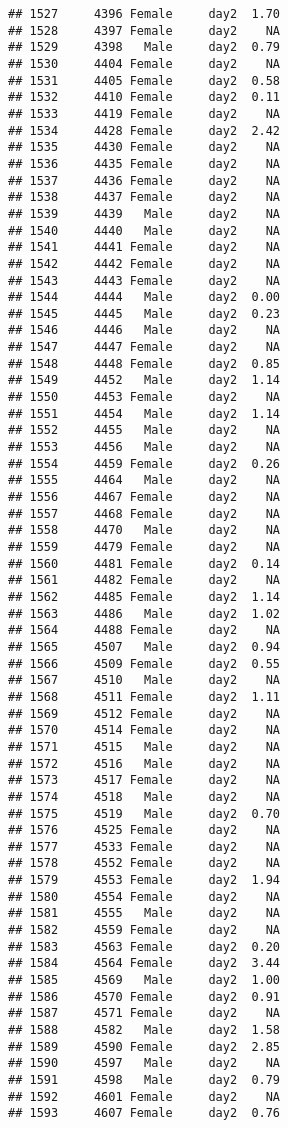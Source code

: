 \documentclass[
]{article}
\begin{document}
\begin{verbatim}
## 1527     4396 Female     day2  1.70
## 1528     4397 Female     day2    NA
## 1529     4398   Male     day2  0.79
## 1530     4404 Female     day2    NA
## 1531     4405 Female     day2  0.58
## 1532     4410 Female     day2  0.11
## 1533     4419 Female     day2    NA
## 1534     4428 Female     day2  2.42
## 1535     4430 Female     day2    NA
## 1536     4435 Female     day2    NA
## 1537     4436 Female     day2    NA
## 1538     4437 Female     day2    NA
## 1539     4439   Male     day2    NA
## 1540     4440   Male     day2    NA
## 1541     4441 Female     day2    NA
## 1542     4442 Female     day2    NA
## 1543     4443 Female     day2    NA
## 1544     4444   Male     day2  0.00
## 1545     4445   Male     day2  0.23
## 1546     4446   Male     day2    NA
## 1547     4447 Female     day2    NA
## 1548     4448 Female     day2  0.85
## 1549     4452   Male     day2  1.14
## 1550     4453 Female     day2    NA
## 1551     4454   Male     day2  1.14
## 1552     4455   Male     day2    NA
## 1553     4456   Male     day2    NA
## 1554     4459 Female     day2  0.26
## 1555     4464   Male     day2    NA
## 1556     4467 Female     day2    NA
## 1557     4468 Female     day2    NA
## 1558     4470   Male     day2    NA
## 1559     4479 Female     day2    NA
## 1560     4481 Female     day2  0.14
## 1561     4482 Female     day2    NA
## 1562     4485 Female     day2  1.14
## 1563     4486   Male     day2  1.02
## 1564     4488 Female     day2    NA
## 1565     4507   Male     day2  0.94
## 1566     4509 Female     day2  0.55
## 1567     4510   Male     day2    NA
## 1568     4511 Female     day2  1.11
## 1569     4512 Female     day2    NA
## 1570     4514 Female     day2    NA
## 1571     4515   Male     day2    NA
## 1572     4516   Male     day2    NA
## 1573     4517 Female     day2    NA
## 1574     4518   Male     day2    NA
## 1575     4519   Male     day2  0.70
## 1576     4525 Female     day2    NA
## 1577     4533 Female     day2    NA
## 1578     4552 Female     day2    NA
## 1579     4553 Female     day2  1.94
## 1580     4554 Female     day2    NA
## 1581     4555   Male     day2    NA
## 1582     4559 Female     day2    NA
## 1583     4563 Female     day2  0.20
## 1584     4564 Female     day2  3.44
## 1585     4569   Male     day2  1.00
## 1586     4570 Female     day2  0.91
## 1587     4571 Female     day2    NA
## 1588     4582   Male     day2  1.58
## 1589     4590 Female     day2  2.85
## 1590     4597   Male     day2    NA
## 1591     4598   Male     day2  0.79
## 1592     4601 Female     day2    NA
## 1593     4607 Female     day2  0.76

\end{verbatim}
\end{document}
